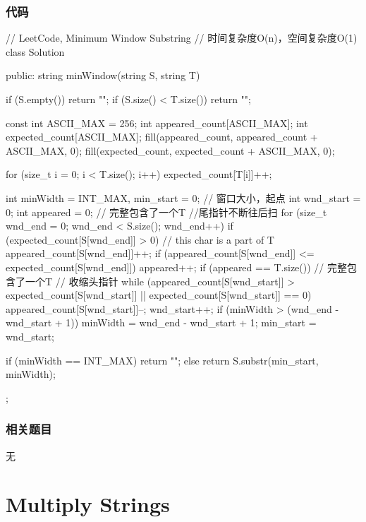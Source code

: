\subsubsection{代码}
\begin{Code}
// LeetCode, Minimum Window Substring
// 时间复杂度O(n)，空间复杂度O(1)
class Solution {
public:
    string minWindow(string S, string T) {
        if (S.empty()) return "";
        if (S.size() < T.size()) return "";

        const int ASCII_MAX = 256;
        int appeared_count[ASCII_MAX];
        int expected_count[ASCII_MAX];
        fill(appeared_count, appeared_count + ASCII_MAX, 0);
        fill(expected_count, expected_count + ASCII_MAX, 0);

        for (size_t i = 0; i < T.size(); i++) expected_count[T[i]]++;

        int minWidth = INT_MAX, min_start = 0;  // 窗口大小，起点
        int wnd_start = 0;
        int appeared = 0;  // 完整包含了一个T
        //尾指针不断往后扫
        for (size_t wnd_end = 0; wnd_end < S.size(); wnd_end++) {
            if (expected_count[S[wnd_end]] > 0)  {  // this char is a part of T
                appeared_count[S[wnd_end]]++;
                if (appeared_count[S[wnd_end]] <= expected_count[S[wnd_end]])
                    appeared++;
            }
            if (appeared == T.size()) {  // 完整包含了一个T
                // 收缩头指针
                while (appeared_count[S[wnd_start]] > expected_count[S[wnd_start]]
                        || expected_count[S[wnd_start]] == 0) {
                    appeared_count[S[wnd_start]]--;
                    wnd_start++;
                }
                if (minWidth > (wnd_end - wnd_start + 1)) {
                    minWidth = wnd_end - wnd_start + 1;
                    min_start = wnd_start;
                }
            }
        }

        if (minWidth == INT_MAX) return "";
        else return S.substr(min_start, minWidth);
    }
};
\end{Code}


\subsubsection{相关题目}

\begindot
\item 无
\myenddot


\section{Multiply Strings} %
\label{sec:multiply-strings}


